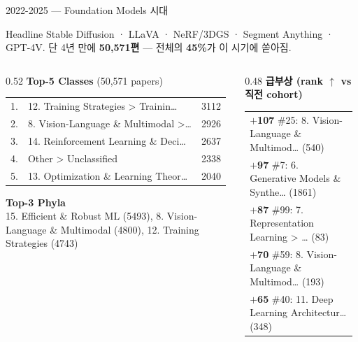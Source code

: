 \documentclass[aspectratio=169,t]{beamer}
\newcommand{\hot}[1]{\textcolor{accentorange}{\textbf{#1}}}
\newcommand{\muted}[1]{\textcolor{mutedgray}{#1}}
\begin{document}
\begin{frame}{2022-2025 \quad — \quad Foundation Models 시대}
\small
\begin{block}{Headline}
Stable Diffusion · LLaVA · NeRF/3DGS · Segment Anything · GPT-4V. 단 4년 만에 \hot{50,571편} — 전체의 \hot{45\%}가 이 시기에 쏟아짐.
\end{block}
\vspace{4pt}

\begin{columns}[T,onlytextwidth]
\begin{column}{0.52\textwidth}
\textbf{Top-5 Classes} \muted{\scriptsize (50,571 papers)}\\[2pt]
\scriptsize
\begin{tabular}{@{}rlr@{}}
    1. & 12. Training Strategies > Trainin… & 3112 \\
    2. & 8. Vision-Language \& Multimodal >… & 2926 \\
    3. & 14. Reinforcement Learning \& Deci… & 2637 \\
    4. & Other > Unclassified & 2338 \\
    5. & 13. Optimization \& Learning Theor… & 2040 \\
\end{tabular}
\vspace{8pt}

\textbf{\small Top-3 Phyla}\\[2pt]
\scriptsize 15. Efficient \& Robust ML (5493), 8. Vision-Language \& Multimodal (4800), 12. Training Strategies (4743)
\end{column}

\begin{column}{0.48\textwidth}
\textbf{급부상 (rank $\uparrow$ vs 직전 cohort)}\\[2pt]
\scriptsize
\begin{tabular}{@{}p{0.95\linewidth}@{}}
    \hot{$+$107} \#25: 8. Vision-Language \& Multimod… (540) \\
    \hot{$+$97} \#7: 6. Generative Models \& Synthe… (1861) \\
    \hot{$+$87} \#99: 7. Representation Learning > … (83) \\
    \hot{$+$70} \#59: 8. Vision-Language \& Multimod… (193) \\
    \hot{$+$65} \#40: 11. Deep Learning Architectur… (348) \\
\end{tabular}
\end{column}
\end{columns}
\end{frame}
\end{document}
